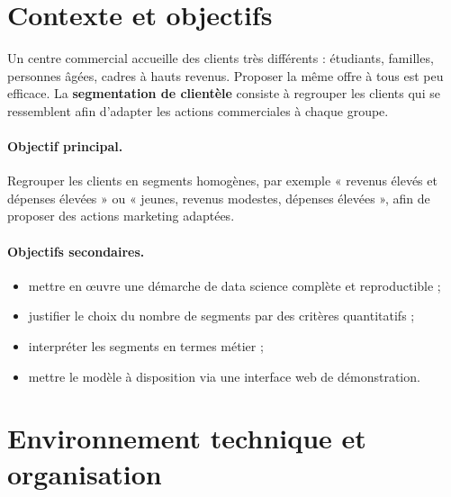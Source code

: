 \documentclass[11pt,a4paper]{article}
\begin{document}
\section{Contexte et objectifs}

Un centre commercial accueille des clients très différents : étudiants, familles, personnes âgées, cadres à hauts revenus. Proposer la même offre à tous est peu efficace. La \textbf{segmentation de clientèle} consiste à regrouper les clients qui se ressemblent afin d'adapter les actions commerciales à chaque groupe.

\paragraph{Objectif principal.} Regrouper les clients en segments homogènes, par exemple « revenus élevés et dépenses élevées » ou « jeunes, revenus modestes, dépenses élevées », afin de proposer des actions marketing adaptées.

\paragraph{Objectifs secondaires.}
\begin{itemize}
  \item mettre en œuvre une démarche de data science complète et reproductible ;
  \item justifier le choix du nombre de segments par des critères quantitatifs ;
  \item interpréter les segments en termes métier ;
  \item mettre le modèle à disposition via une interface web de démonstration.
\end{itemize}

\section{Environnement technique et organisation}
\end{document}
